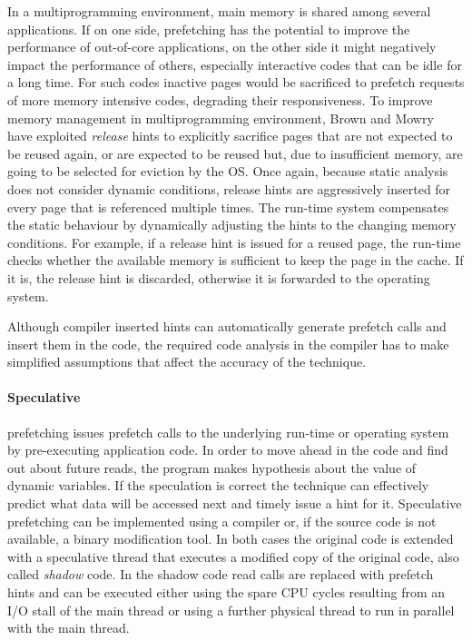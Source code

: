 In a multiprogramming environment, main memory is shared among several applications. If on one side, prefetching has the potential to improve the performance of out-of-core applications, on the other side it might negatively impact 
the performance of others, especially interactive codes that can be idle for a long time. For such codes inactive pages would be sacrificed to prefetch requests of more memory intensive codes, degrading their responsiveness. To 
improve memory management in multiprogramming environment, Brown and Mowry~\cite{Brown2000} have exploited \textit{release} hints to explicitly sacrifice pages that are not expected to be reused again, or are expected to be reused 
but, due to insufficient memory, are going to be selected for eviction by the OS. Once again, because static analysis does not consider dynamic conditions, release hints are aggressively inserted for every page that is referenced 
multiple times. The run-time system compensates the static behaviour by dynamically adjusting the hints to the changing memory conditions. For example, if a release hint is issued for a reused page, the run-time checks whether the 
available memory is sufficient to keep the page in the cache. If it is, the release hint is discarded, otherwise it is forwarded to the operating system.

Although compiler inserted hints can automatically generate prefetch calls and insert them in the code, the required code analysis in the compiler has to make simplified assumptions that affect the accuracy of the technique.

\paragraph{Speculative} prefetching issues prefetch calls to the underlying run-time or operating system by pre-executing application code. In order to move ahead in the code and find out about future reads, the program makes hypothesis about 
the value of dynamic variables. If the speculation is correct the technique can effectively predict what data will be accessed next and timely issue a hint for it. Speculative prefetching can be implemented using a compiler or, if 
the source code is not available, a binary modification tool. In both cases the original code is extended with a speculative thread that executes a modified copy of the original code, also called \textit{shadow} code. In the shadow 
code read calls are replaced with prefetch hints and can be executed either using the spare CPU cycles resulting from an I/O stall of the main thread or using a further physical thread to run in parallel with the main thread. 

